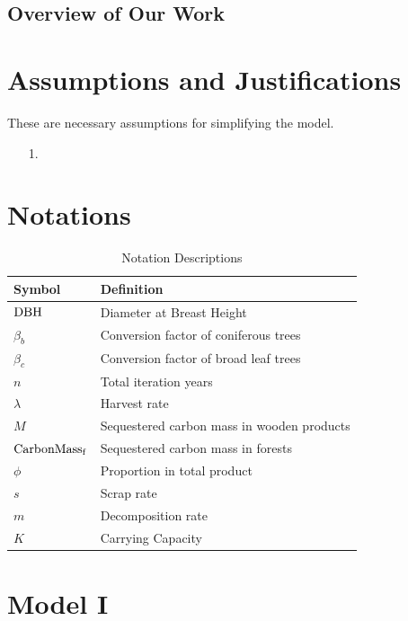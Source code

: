 \documentclass{mcmthesis}
\numberwithin{figure}{section}
\numberwithin{table}{section}
\numberwithin{equation}{section}
\begin{document}
\subsection{Overview of Our Work}




\section{Assumptions and Justifications}
These are necessary assumptions for simplifying the model.
\begin{enumerate}
  \item [1.] 
\end{enumerate}

\newpage

\section{Notations}

\renewcommand\arraystretch{1.5}

\begin{table}[htpb!]
  \centering
  \caption{Notation Descriptions}
  \begin{tabular}{m{2.5cm}<{\centering}|m{12.5cm}<{\centering}}
  \toprule[1.5pt]
  \textbf{Symbol} & \textbf{Definition} \\ \hline
  $ \rm{DBH} $ & Diameter at Breast Height \\
  $ \beta_b $ & Conversion factor of coniferous trees\\
  $\beta_c$ & Conversion factor of broad leaf trees\\
  $ n $ & Total iteration years\\
  $ \lambda $ & Harvest rate\\
  $ M $ & Sequestered carbon mass in wooden products \\
  $ \rm{CarbonMass_f} $ & Sequestered carbon mass in forests \\
  $ \phi $ & Proportion in total product\\
  $ s $ & Scrap rate\\
  $ m $ & Decomposition rate \\
  $ K $ & Carrying Capacity \\

  \bottomrule[1.5pt]
  \end{tabular}
\end{table}



\section{Model I}
\end{document}
